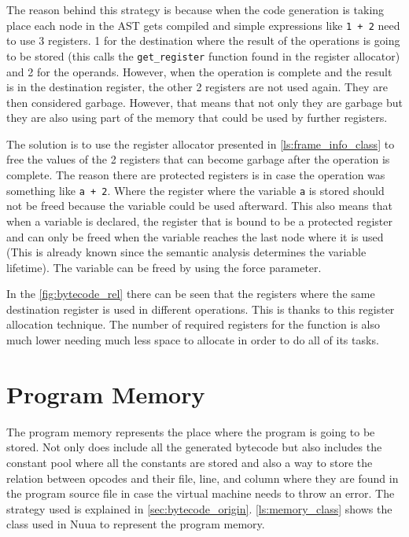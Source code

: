 The reason behind this strategy is because when the code generation is taking place each node in the AST gets compiled and simple expressions like
\texttt{1 + 2} need to use 3 registers. 1 for the destination where the result of the operations is going to be stored (this calls the \texttt{get\_register}
function found in the register allocator) and 2 for the operands. However, when the operation is complete and the result is in the destination register,
the other 2 registers are not used again. They are then considered garbage. However, that means that not only they are garbage but they are also using
part of the memory that could be used by further registers.

The solution is to use the register allocator presented in \autoref{ls:frame_info_class} to free the values of the 2 registers
that can become garbage after the operation is complete. The reason there are protected registers is in case the operation was something
like \texttt{a + 2}. Where the register where the variable \texttt{a} is stored should not be freed because the variable could be used afterward.
This also means that when a variable is declared, the register that is bound to be a protected register and can only be freed when the
variable reaches the last node where it is used (This is already known since the semantic analysis determines the variable lifetime).
The variable can be freed by using the force parameter.

In the \autoref{fig:bytecode_rel} there can be seen that the registers where the same destination register is used in different operations. This is
thanks to this register allocation technique. The number of required registers for the function is also much lower needing much less space to allocate
in order to do all of its tasks.

\section{Program Memory}

The program memory represents the place where the program is going to be stored. Not only does include all the generated bytecode but also
includes the constant pool where all the constants are stored and also a way to store the relation between opcodes and their file, line, and column where
they are found in the program source file in case the virtual machine needs to throw an error.
The strategy used is explained in \autoref{sec:bytecode_origin}. \autoref{ls:memory_class} shows the class used in Nuua to represent the program memory.

